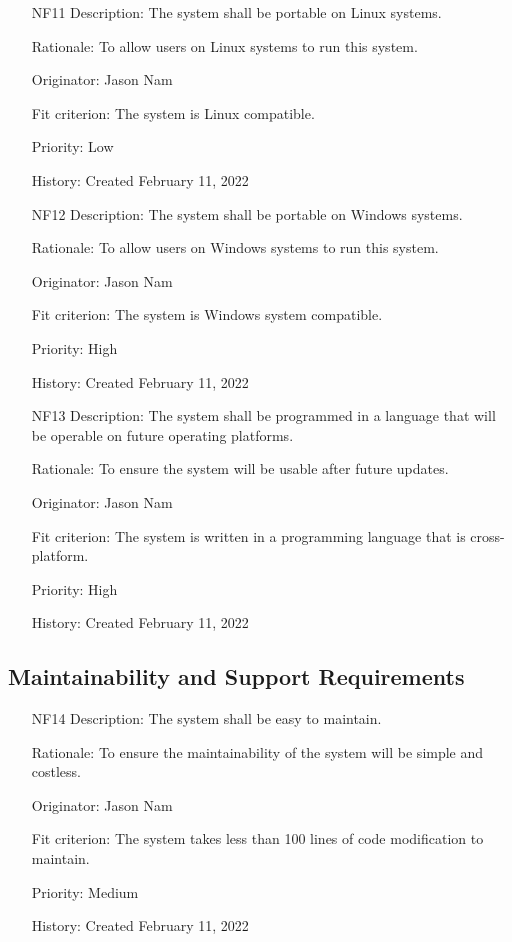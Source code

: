 \documentclass[12pt, titlepage]{article}
\begin{document}
\begin{itemize}
    \item[NF11]
Description: The system shall be portable on Linux systems.

Rationale: To allow users on Linux systems to run this system.

Originator: Jason Nam

Fit criterion: The system is Linux compatible.

Priority: Low

History: Created February 11, 2022

    \item[NF12]
Description: The system shall be portable on Windows systems.

Rationale: To allow users on Windows systems to run this system.

Originator: Jason Nam

Fit criterion: The system is Windows system compatible.

Priority: High

History: Created February 11, 2022

    \item[NF13]
Description: The system shall be programmed in a language that will be operable on future operating platforms.

Rationale: To ensure the system will be usable after future updates.

Originator: Jason Nam

Fit criterion: The system is written in a programming language that is cross-platform.

Priority: High

History: Created February 11, 2022

\end{itemize}

\subsection{Maintainability and Support Requirements}

\begin{itemize}
    \item[NF14]
Description: The system shall be easy to maintain.

Rationale: To ensure the maintainability of the system will be simple and costless.

Originator: Jason Nam

Fit criterion: The system takes less than 100 lines of code modification to maintain.

Priority: Medium

History: Created February 11, 2022

\end{itemize}
\end{document}
